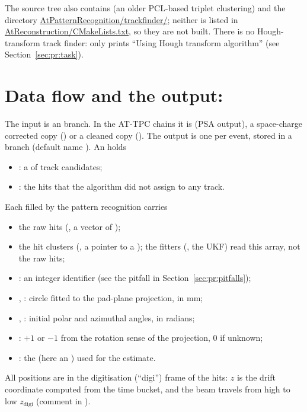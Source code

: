 The source tree also contains  (an older PCL-based triplet clustering) and the
directory \url{AtPatternRecognition/trackfinder/}; neither is listed in \url{AtReconstruction/CMakeLists.txt},
so they are not built. There is no Hough-transform track finder: 
only prints ``Using Hough transform algorithm'' (see Section~\ref{sec:pr:task}).

\section{Data flow and the output: }
\label{sec:pr:output}

The input is an  branch. In the AT-TPC chains it is  (PSA output), a
space-charge corrected copy () or a cleaned copy (). The output
is one  per event, stored in a  branch (default name
). An  holds
\begin{itemize}
\item {}: a  of track candidates;
\item {}: the hits that the algorithm did not assign to any track.
\end{itemize}

Each  filled by the pattern recognition carries
\begin{itemize}
\item the raw hits (, a vector of );
\item the hit clusters (, a pointer to a );
  the fitters (, the UKF) read this array, not the raw hits;
\item {}: an integer identifier (see the pitfall in Section~\ref{sec:pr:pitfalls});
\item {}, : circle fitted to the pad-plane projection, in mm;
\item {}, : initial polar and azimuthal angles, in radians;
\item {}: $+1$ or $-1$ from the rotation sense of the projection, $0$ if unknown;
\item {}: the  (here an ) used for the estimate.
\end{itemize}
All positions are in the digitisation (``digi'') frame of the hits: $z$ is the drift coordinate
computed from the time bucket, and the beam travels from high to low $z_\mathrm{digi}$ (comment in
).

